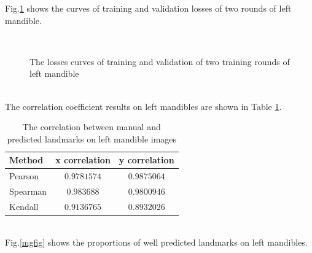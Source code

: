\documentclass[12pt,a4paper]{article}
\begin{document}
Fig.\ref{lossmgcurves} shows the curves of training and validation losses of two rounds of left mandible.
\begin{figure}[h!]
\centering
{}~~
\caption{The losses curves of training and validation of two training rounds of left mandible  }
\label{lossmgcurves}
\end{figure}~\\[2cm]
The correlation coefficient results on left mandibles are shown in Table \ref{corrmg}.
\begin{table}[h!]
	\centering
	\begin{tabular}{l c c}
		Method & x correlation & y correlation \\ \hline
		Pearson & $0.9781574$ & $0.9875064$ \\ \hline
		Spearman & $0.983688$ & $0.9800946$ \\ \hline
		Kendall & $0.9136765$ & $0.8932026$ \\ \hline
	\end{tabular}
	\caption{The correlation between manual and predicted landmarks on left mandible images}
	\label{corrmg}
\end{table}~\\
Fig.\ref{mgfig} shows the proportions of well predicted landmarks on left mandibles.
\end{document}
